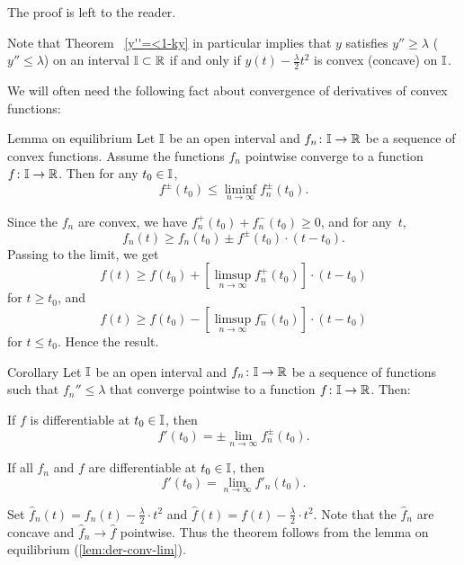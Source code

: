 The proof is left to the reader.


Note that Theorem ~\ref{y''=<1-ky} in particular implies that $y$ satisfies $y''\ge \lambda$ ( $y''\le \lambda$)  on an interval $\II\subset\RR$  if and only if $y(t)-\frac{\lambda}{2}t^2$ is convex (concave) on $\mathbb{I}$.

We will often need the following fact about convergence of derivatives of convex functions:

{\sloppy 

\begin{thm}{Lemma on equilibrium}\label{lem:der-conv-lim}
Let $\mathbb{I}$ be an open interval 
and $f_n\:\II\to\RR$ be a sequence of 
convex functions. 
Assume the functions $f_n$ pointwise converge to a function $f\:\II\to\RR$.
Then for any $t_0\in \II$,
\[f^\pm(t_0)\le \liminf_{n\to\infty}f^\pm_n(t_0).\]
\end{thm}

}

Since the $f_n$ are convex, we have $f^+_n(t_0)+f^-_n(t_0)\ge0$, and for any~$t$,
\[f_n(t)\ge f_n(t_0)\pm f^\pm(t_0)\cdot (t-t_0).\]
Passing to the limit, we get
\[f(t)\ge f(t_0)+\left[\limsup_{n\to\infty}f^+_n(t_0)\right]\cdot (t-t_0)\]
for $t\ge t_0$, and 
\[f(t)\ge f(t_0)-\left[\limsup_{n\to\infty}f^-_n(t_0)\right]\cdot (t-t_0)\]
for $t\le t_0$.
Hence the result.
\qeds

\begin{thm}{Corollary}
\label{cor:der-conv-lim}
Let $\mathbb{I}$ be an open interval 
and $f_n\:\II\to\RR$ be a sequence of functions such that $f_n''\le \lambda$ that converge pointwise to a function $f\:\II\to\RR$.
Then: 
\begin{subthm}{} If $f$ is differentiable at $t_0\in \II$, then
\[f'(t_0)=\pm\lim_{n\to\infty} f^\pm_n(t_0).\]
\end{subthm}

\begin{subthm}{} If all $f_n$ and $f$ are differentiable at $t_0\in \II$, then
\[f'(t_0)=\lim_{n\to\infty} f'_n(t_0).\]
\end{subthm}
\end{thm}

 Set $\hat f_n(t)=f_n(t)-\tfrac{\lambda}{2}\cdot t^2$ and $\hat f(t)=f(t)-\tfrac\lambda2\cdot t^2$.
Note that the $\hat f_n$ are concave and $\hat f_n\to \hat f$ pointwise.
Thus the theorem follows from the lemma on equilibrium (\ref{lem:der-conv-lim}).\qeds











